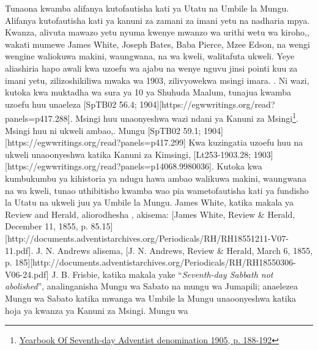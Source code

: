 Tunaona kwamba alifanya kutofautisha kati ya Utatu na Umbile la Mungu. Alifanya kutofautisha kati ya kanuni za zamani za imani yetu na nadharia mpya. Kwanza, alivuta mawazo yetu nyuma kwenye mwanzo wa urithi wetu wa kiroho,, wakati mumewe James White, Joseph Bates, Baba Pierce, Mzee Edson, na wengi wengine waliokuwa makini, waungwana, na wa kweli, walitafuta ukweli. Yeye aliashiria hapo awali kwa uzoefu wa ajabu na wenye nguvu jinsi pointi kuu za imani yetu, zilizoshikiliwa mwaka wa 1903, zilivyowekwa msingi imara.   . Ni wazi, kutoka kwa muktadha wa sura ya 10 ya Shuhuda Maalum, tunajua kwamba uzoefu huu unaeleza [SpTB02 56.4; 1904][https://egwwritings.org/read?panels=p417.288]. Msingi huu unaonyeshwa wazi ndani ya Kanuni za Msingi\footnote{\href{https://static1.squarespace.com/static/554c4998e4b04e89ea0c4073/t/59d17e24c027d84167e17617/1506901547915/SDA-YB1905+\%28P.+188-192\%29.pdf}{Yearbook Of Seventh-day Adventist denomination 1905, p. 188-192}}. Msingi huu ni ukweli ambao,. Mungu [SpTB02 59.1; 1904][https://egwwritings.org/read?panels=p417.299] Kwa kuzingatia uzoefu huu na ukweli unaoonyeshwa katika Kanuni za Kimsingi, [Lt253-1903.28; 1903][https://egwwritings.org/read?panels=p14068.9980036]. Kutoka kwa kumbukumbu ya kihistoria ya ndugu hawa ambao walikuwa makini, waungwana na wa kweli, tunao uthibitisho kwamba wao pia wametofautisha kati ya fundisho la Utatu na ukweli juu ya Umbile la Mungu. James White, katika makala ya Review and Herald, aliorodhesha , akisema: [James White, Review \& Herald, December 11, 1855, p. 85.15][http://documents.adventistarchives.org/Periodicals/RH/RH18551211-V07-11.pdf]. J. N. Andrews alisema, [J. N. Andrews, Review \& Herald, March 6, 1855, p. 185][http://documents.adventistarchives.org/Periodicals/RH/RH18550306-V06-24.pdf] J. B. Frisbie, katika makala yake “\textit{Seventh-day Sabbath not abolished}”, analinganisha Mungu wa Sabato na mungu wa Jumapili; anaelezea Mungu wa Sabato katika mwanga wa Umbile la Mungu unaoonyeshwa katika hoja ya kwanza ya Kanuni za Msingi. Mungu wa 